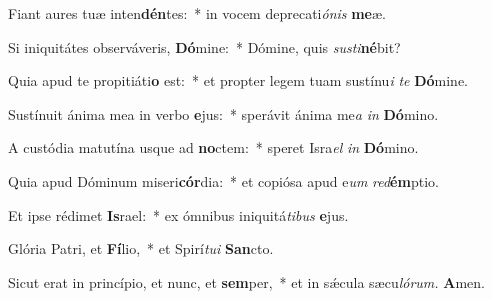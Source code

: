 \item Fiant aures tuæ inten\textbf{dén}tes:~* in vocem deprecati\textit{ónis} \textbf{me}æ.
\item Si iniquitátes observáveris, \textbf{Dó}mine:~* Dómine, quis \textit{susti}\hspace*{-0.01em}\textbf{né}bit?
\item Quia apud te propitiáti\textbf{o} est:~* et pro\-pter legem tuam sustínu\textit{i} \textit{te} \textbf{Dó}mine.
\item Sustínuit ánima mea in verbo \textbf{e}jus:~* sperávit ánima me\tinyhspace\textit{a} \textit{in} \textbf{Dó}mino.
\item A custódia matutína usque ad \textbf{no}ctem:~* speret Isra\tinyhspace\textit{el} \textit{in} \textbf{Dó}mino.
\item Quia apud Dóminum miseri\textbf{cór}dia:~* et copiósa apud e\tinyhspace\textit{um} \textit{red}\textbf{ém}ptio.
\item Et ipse rédimet \textbf{Is}rael:~* ex ómnibus iniquitá\tinyhspace\textit{tibus} \textbf{e}jus.
\item Glória Patri, et \textbf{Fí}lio,~* et Spirí\tinyhspace\textit{tui} \textbf{San}cto.
\item Sicut erat in princípio, et nunc, et \textbf{sem}per,~* et in sǽcula sæcu\tinyhspace\textit{lórum.} \textbf{A}men.
